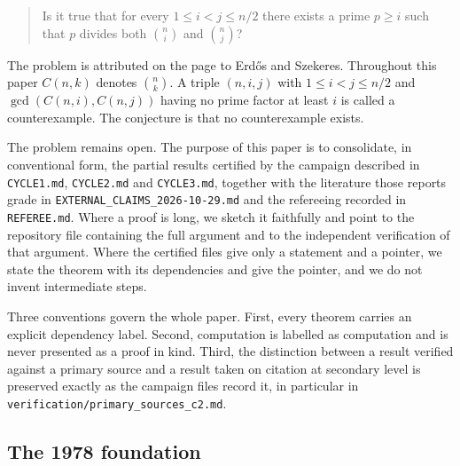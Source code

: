 \documentclass[11pt]{article}
\theoremstyle{remark}
\begin{document}
\begin{quote}
Is it true that for every $1\le i<j\le n/2$ there exists a prime $p\ge i$ such that $p$ divides both $\binom{n}{i}$ and $\binom{n}{j}$?
\end{quote}

The problem is attributed on the page to Erd\H{o}s and Szekeres. Throughout this paper $C(n,k)$ denotes $\binom{n}{k}$. A triple $(n,i,j)$ with $1\le i<j\le n/2$ and $\gcd(C(n,i),C(n,j))$ having no prime factor at least $i$ is called a counterexample. The conjecture is that no counterexample exists.

The problem remains open. The purpose of this paper is to consolidate, in conventional form, the partial results certified by the campaign described in \texttt{CYCLE1.md}, \texttt{CYCLE2.md} and \texttt{CYCLE3.md}, together with the literature those reports grade in \texttt{EXTERNAL\_CLAIMS\_2026-10-29.md} and the refereeing recorded in \texttt{REFEREE.md}. Where a proof is long, we sketch it faithfully and point to the repository file containing the full argument and to the independent verification of that argument. Where the certified files give only a statement and a pointer, we state the theorem with its dependencies and give the pointer, and we do not invent intermediate steps.

Three conventions govern the whole paper. First, every theorem carries an explicit dependency label. Second, computation is labelled as computation and is never presented as a proof in kind. Third, the distinction between a result verified against a primary source and a result taken on citation at secondary level is preserved exactly as the campaign files record it, in particular in \texttt{verification/primary\_sources\_c2.md}.

\subsection{The 1978 foundation}
\end{document}
